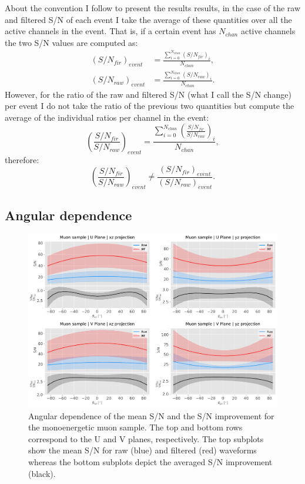 About the convention I follow to present the results results, in the case of the raw and filtered S/N of each event I take the average of these quantities over all the active channels in the event. That is, if a certain event has $N_{chan}$ active channels the two S/N values are computed as:
\begin{equation}
\begin{split}
\left(S/N_{fir}\right)_{event} &= \frac{\sum_{i=0}^{N_{chan}} \left(S/N_{fir}\right)_{i}}{N_{chan}},\\
\left(S/N_{raw}\right)_{event} &= \frac{\sum_{i=0}^{N_{chan}} \left(S/N_{raw}\right)_{i}}{N_{chan}}.
\end{split}
\end{equation}
However, for the ratio of the raw and filtered S/N (what I call the S/N change) per event I do not take the ratio of the previous two quantities but compute the average of the individual ratios per channel in the event:
\begin{equation}
\left(\frac{S/N_{fir}}{S/N_{raw}}\right)_{event} = \frac{\sum_{i=0}^{N_{chan}} \left(\frac{S/N_{fir}}{S/N_{raw}}\right)_{i}}{N_{chan}},
\end{equation}
therefore:
\begin{equation}
\left(\frac{S/N_{fir}}{S/N_{raw}}\right)_{event}  \neq \frac{\left(S/N_{fir}\right)_{event}}{\left(S/N_{raw}\right)_{event}}.
\end{equation}

\subsection{Angular dependence}
\label{subsec:2.5.1}

\begin{figure}[t]
	\centering
	\includegraphics[width=0.9\linewidth]{Images/Matched_Filter/larsoft_muon_angular.pdf}
	\caption[Angular dependence of the mean S/N and the S/N improvement for the monoenergetic muon sample.]{Angular dependence of the mean S/N and the S/N improvement for the monoenergetic muon sample. The top and bottom rows correspond to the U and V planes, respectively. The top subplots show the mean S/N for raw (blue) and filtered (red) waveforms whereas the bottom subplots depict the averaged S/N improvement (black).}
	\label{fig:angular_muon}
\end{figure}

